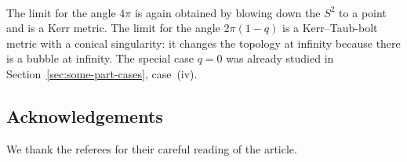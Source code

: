 \documentclass[10pt,a4paper]{amsart}
\numberwithin{equation}{section}
\begin{document}
\begin{pc}
\begin{align*}
 \end{align*}
 The limit for the angle $4\pi$ is again obtained by blowing down the $S^2$ to a point and is a Kerr metric. The limit for the angle $2\pi(1-q)$ is a Kerr--Taub-bolt metric with a conical singularity: it changes the topology at infinity because there is a bubble at infinity. The special case $q=0$ was already studied in Section~\ref{sec:some-part-cases}, case~(iv).
\end{pc}

\subsection*{Acknowledgements}
We thank the referees for their careful reading of the article.

\end{document}
